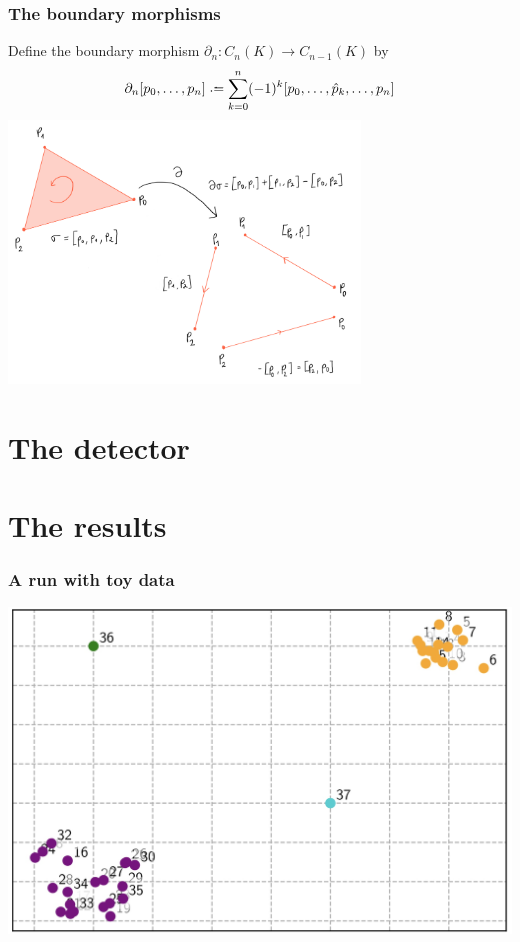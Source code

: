 \documentclass{beamer}
\begin{document}
\begin{frame}
	\frametitle{The boundary morphisms}
	Define the boundary morphism \( \partial_n \colon C_n(K) \to C_{n-1}(K) \) by
	\begin{equation*}
		\partial_n [p_0, \dots, p_n] \defeq \sum_{k = 0}^{n} (-1)^k [p_0, \dots, \hat p_k,
		\dots, p_n]
	\end{equation*}
	\pause
	\centering \includegraphics[width=0.7\textwidth]{drawings/boundary}
	
\end{frame}	

\section{The detector}


\section{The results}
\begin{frame}
	\frametitle{A run with toy data}
	\centering
	\includegraphics[width=\textwidth]{beamer/clusters}
\end{frame}
\end{document}
